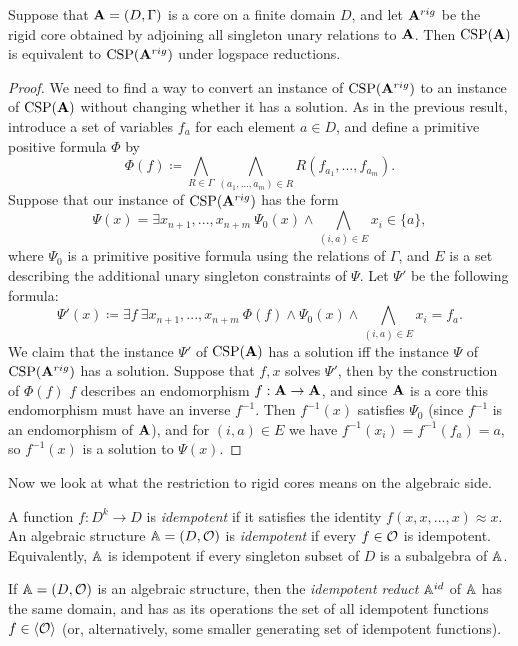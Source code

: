 \documentclass[letterpaper,11pt]{article}
\DeclareMathOperator{\CSP}{CSP}
\begin{document}
\begin{thm}\label{rigid-core-reduction} Suppose that $\mathbf{A} = (D, \Gamma)$ is a core on a finite domain $D$, and let $\mathbf{A}^{rig}$ be the rigid core obtained by adjoining all singleton unary relations to $\mathbf{A}$. Then $\CSP(\fA)$ is equivalent to $\CSP(\fA^{rig})$ under logspace reductions.
\end{thm}
\begin{proof} We need to find a way to convert an instance of $\CSP(\fA^{rig})$ to an instance of $\CSP(\fA)$ without changing whether it has a solution. As in the previous result, introduce a set of variables $f_a$ for each element $a \in D$, and define a primitive positive formula $\Phi$ by
\[
\Phi(f) \coloneqq \bigwedge_{R \in \Gamma} \bigwedge_{(a_1, ..., a_m) \in R} R(f_{a_1}, ..., f_{a_m}).
\]
Suppose that our instance of $\CSP(\fA^{rig})$ has the form
\[
\Psi(x) = \exists x_{n+1}, ..., x_{n+m}\ \Psi_0(x) \wedge \bigwedge_{(i,a) \in E} x_i \in \{a\},
\]
where $\Psi_0$ is a primitive positive formula using the relations of $\Gamma$, and $E$ is a set describing the additional unary singleton constraints of $\Psi$. Let $\Psi'$ be the following formula:
\[
\Psi'(x) \coloneqq \exists f\ \exists x_{n+1}, ..., x_{n+m}\ \Phi(f) \wedge \Psi_0(x) \wedge \bigwedge_{(i,a) \in E} x_i = f_{a}.
\]
We claim that the instance $\Psi'$ of $\CSP(\fA)$ has a solution iff the instance $\Psi$ of $\CSP(\fA^{rig})$ has a solution. Suppose that $f,x$ solves $\Psi'$, then by the construction of $\Phi(f)$ $f$ describes an endomorphism $f : \mathbf{A} \rightarrow \mathbf{A}$, and since $\mathbf{A}$ is a core this endomorphism must have an inverse $f^{-1}$. Then $f^{-1}(x)$ satisfies $\Psi_0$ (since $f^{-1}$ is an endomorphism of $\mathbf{A}$), and for $(i,a) \in E$ we have $f^{-1}(x_i) = f^{-1}(f_{a}) = a$, so $f^{-1}(x)$ is a solution to $\Psi(x)$.
\end{proof}

Now we look at what the restriction to rigid cores means on the algebraic side.

\begin{defn} A function $f : D^k \rightarrow D$ is \emph{idempotent} if it satisfies the identity $f(x, x, ..., x) \approx x$. An algebraic structure $\mathbb{A} = (D, \mathcal{O})$ is \emph{idempotent} if every $f \in \mathcal{O}$ is idempotent. Equivalently, $\mathbb{A}$ is idempotent if every singleton subset of $D$ is a subalgebra of $\mathbb{A}$.
\end{defn}

\begin{defn} If $\mathbb{A} = (D, \mathcal{O})$ is an algebraic structure, then the \emph{idempotent reduct} $\mathbb{A}^{id}$ of $\mathbb{A}$ has the same domain, and has as its operations the set of all idempotent functions $f \in \langle \mathcal{O} \rangle$ (or, alternatively, some smaller generating set of idempotent functions).
\end{defn}
\end{document}
